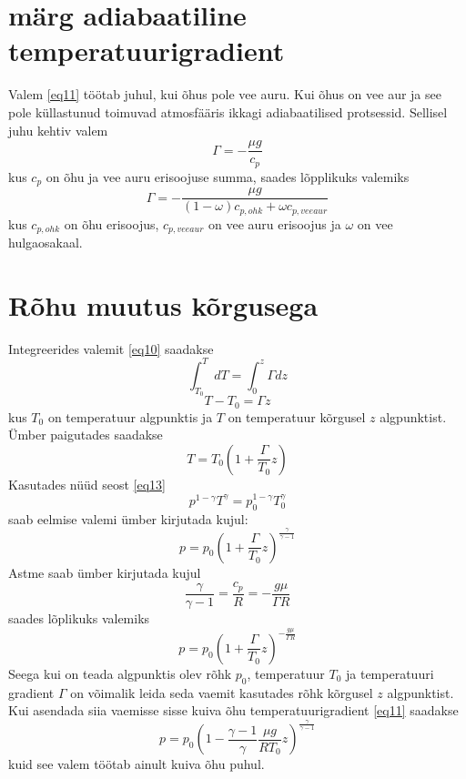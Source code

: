 \documentclass{trkut}%
\begin{document}
\section{märg adiabaatiline temperatuurigradient}
Valem \ref{eq11} töötab juhul, kui õhus pole vee auru. Kui õhus on vee aur ja see pole küllastunud toimuvad atmosfääris ikkagi adiabaatilised protsessid. Sellisel juhu kehtiv valem 
\begin{equation*}\label{eq11}
\Gamma = -\frac{\mu g}{c_p}
\end{equation*}
kus $c_p$ on õhu ja vee auru erisoojuse summa, saades lõpplikuks valemiks
\begin{equation*}\label{eq11}
\Gamma = -\frac{\mu g}{(1-\omega)c_{p,ohk} + \omega c_{p,vee aur}}
\end{equation*}
kus $c_{p,ohk}$ on õhu erisoojus, $c_{p,vee aur}$ on vee auru erisoojus ja $\omega$ on vee hulgaosakaal.

\section{Rõhu muutus kõrgusega }
Integreerides valemit \ref{eq10} saadakse
\begin{equation*}
\int_{T_0}^{T} dT = \int_{0}^{z} \Gamma dz
\end{equation*}
\begin{equation*}
T-T_0 = \Gamma z
\end{equation*}
kus $T_0$ on temperatuur algpunktis ja $T$ on temperatuur kõrgusel $z$ algpunktist. Ümber paigutades saadakse
\begin{equation*}
T = T_0 \left(1+\frac{\Gamma}{T_0}z\right)
\end{equation*}
Kasutades nüüd seost \ref{eq13}
\begin{equation*}
p^{1-\gamma}T^{\gamma} = p_0^{1-\gamma}T_0^{\gamma}
\end{equation*}
saab eelmise valemi ümber kirjutada kujul:
\begin{equation*}
p=p_0 \left(1+\frac{\Gamma}{T_0}z\right)^{\frac{\gamma}{\gamma-1}}
\end{equation*}
Astme saab ümber kirjutada kujul
\begin{equation*}
\frac{\gamma}{\gamma-1} = \frac{c_p}{R} = -\frac{g\mu}{\Gamma R}
\end{equation*}
saades lõplikuks valemiks
\begin{equation*}
p=p_0 \left(1+\frac{\Gamma}{T_0}z\right)^{ -\frac{g\mu}{\Gamma R}}
\end{equation*}
Seega kui on teada algpunktis olev rõhk $p_0$, temperatuur $T_0$ ja temperatuuri gradient $\Gamma$ on võimalik leida seda vaemit kasutades rõhk kõrgusel $z$ algpunktist. Kui asendada siia vaemisse sisse kuiva õhu temperatuurigradient \ref{eq11} saadakse
\begin{equation*}
p=p_0 \left(1-\frac{\gamma-1}{\gamma}\frac{\mu g}{RT_0}z\right)^{\frac{\gamma}{\gamma-1}}
\end{equation*}
kuid see valem töötab ainult kuiva õhu puhul.
\end{document}
